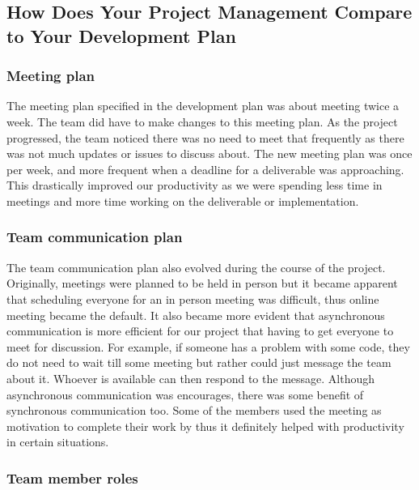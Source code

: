 \documentclass{article}
\begin{document}
	\subsection{How Does Your Project Management Compare to Your Development Plan}
	
	
	\subsubsection{Meeting plan}
	
	The meeting plan specified in the development plan was about meeting twice a week. The team did have to make changes to this meeting plan. As the project progressed, the team noticed there was no need to meet that frequently as there was not much updates or issues to discuss about. The new meeting plan was once per week, and more frequent when a deadline for a deliverable was approaching. This drastically improved our productivity as we were spending less time in meetings and more time working on the deliverable or implementation.
	
	\subsubsection{Team communication plan}
	
	The team communication plan also evolved during the course of the project. Originally, meetings were planned to be held in person but it became apparent that scheduling everyone for an in person meeting was difficult, thus online meeting became the default. It also became more evident that asynchronous communication is more efficient for our project that having to get everyone to meet for discussion. For example, if someone has a problem with some code, they do not need to wait till some meeting but rather could just message the team about it. Whoever is available can then respond to the message. Although asynchronous communication was encourages, there was some benefit of synchronous communication too. Some of the members used the meeting as motivation to complete their work by thus it definitely helped with productivity in certain situations.
	
	\subsubsection{Team member roles}
	
\end{document}
